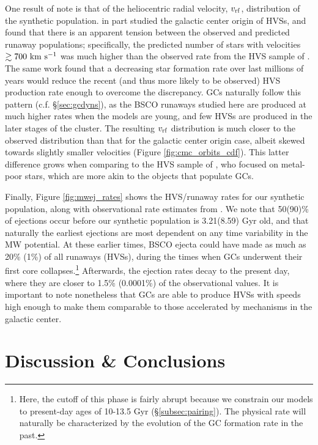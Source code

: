 \documentclass[twocolumn]{aastex631}
\begin{document}
One result of note is that of the heliocentric radial velocity, $v_{\rm rf}$, distribution of the synthetic population.
\citet{2021arXiv211213864G} in part studied the galactic center origin of HVSs, and found that there is an apparent tension between the observed and predicted runaway populations; specifically, the predicted number of stars with velocities $\gtrsim 700~{\rm km~s^{-1}}$ was much higher than the observed rate from the HVS sample of \citet{2018ApJ...866...39B}.
The same work found that a decreasing star formation rate over last millions of years would reduce the recent (and thus more likely to be observed) HVS production rate enough to overcome the discrepancy.
GCs naturally follow this pattern (c.f. \S\ref{sec:gcdyns}), as the BSCO runaways studied here are produced at much higher rates when the models are young, and few HVSs are produced in the later stages of the cluster.
The resulting $v_{\rm rf}$ distribution is much closer to the observed distribution than that for the galactic center origin case, albeit skewed towards slightly smaller velocities (Figure \ref{fig:cmc_orbits_cdf}).
This latter difference grows when comparing to the HVS sample of \citet{2018ApJ...866..121H}, who focused on metal-poor stars, which are more akin to the objects that populate GCs.

Finally, Figure \ref{fig:mwej_rates} shows the HVS/runaway rates for our synthetic population, along with observational rate estimates from \citet{2015ARA&A..53...15B}.
We note that 50(90)\% of ejections occur before our synthetic population is 3.21(8.59) Gyr old, and that naturally the earliest ejections are most dependent on any time variability in the MW potential.
At these earlier times, BSCO ejecta could have made as much as 20\% (1\%) of all runaways (HVSs), during the times when GCs underwent their first core collapses.\footnote{Here, the cutoff of this phase is fairly abrupt because we constrain our models to present-day ages of 10-13.5 Gyr (\S\ref{subsec:pairing}).  The physical rate will naturally be characterized by the evolution of the GC formation rate in the past.}
Afterwards, the ejection rates decay to the present day, where they are closer to 1.5\% (0.0001\%) of the observational values.
It is important to note nonetheless that GCs are able to produce HVSs with speeds high enough to make them comparable to those accelerated by mechanisms in the galactic center.

\section{Discussion \& Conclusions} \label{sec:disccon}
\end{document}
